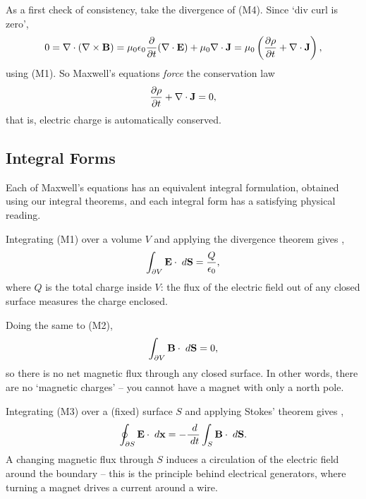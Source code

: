 \documentclass[a4paper]{scrartcl}
\begin{document}
As a first check of consistency, take the divergence of (M4). Since `div curl is zero',
$$
0 = \nabla \cdot (\nabla \times \mathbf{B}) = \mu_0 \epsilon_0 \frac{\partial}{\partial t}(\nabla \cdot \mathbf{E}) + \mu_0 \nabla \cdot \mathbf{J} = \mu_0 \left(\frac{\partial \rho}{\partial t} + \nabla \cdot \mathbf{J}\right),
$$
using (M1). So Maxwell's equations \emph{force} the conservation law
$$
\frac{\partial \rho}{\partial t} + \nabla \cdot \mathbf{J} = 0,
$$
that is, electric charge is automatically conserved.

\subsection{Integral Forms}

Each of Maxwell's equations has an equivalent integral formulation, obtained using our integral theorems, and each integral form has a satisfying physical reading.

Integrating (M1) over a volume $V$ and applying the divergence theorem gives ,
$$
\int_{\partial V} \mathbf{E} \cdot \; d \mathbf{S} = \frac{Q}{\epsilon_0},
$$
where $Q$ is the total charge inside $V$: the flux of the electric field out of any closed surface measures the charge enclosed.

Doing the same to (M2),
$$
\int_{\partial V} \mathbf{B} \cdot \; d \mathbf{S} = 0,
$$
so there is no net magnetic flux through any closed surface. In other words, there are no `magnetic charges' -- you cannot have a magnet with only a north pole.

Integrating (M3) over a (fixed) surface $S$ and applying Stokes' theorem gives ,
$$
\oint_{\partial S} \mathbf{E} \cdot \; d \mathbf{x} = -\frac{\; d}{\; d t}\int_S \mathbf{B} \cdot \; d \mathbf{S}.
$$
A changing magnetic flux through $S$ induces a circulation of the electric field around the boundary -- this is the principle behind electrical generators, where turning a magnet drives a current around a wire.

\begin{center}
\end{center}
\end{document}
